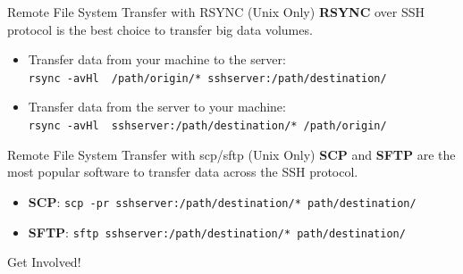 \documentclass[final,t]{beamer}
\begin{document}
\begin{frame}[fragile]{}
\begin{columns}[t]
\begin{column}{.32\linewidth}
      \begin{block}{Remote File System Transfer with RSYNC (Unix Only)}
       \textbf{RSYNC} over SSH protocol is the best choice to transfer big data volumes.
        \begin{itemize}
        \item Transfer data from your machine to the server:\\ \verb|rsync -avHl  /path/origin/* sshserver:/path/destination/|
        \item Transfer data from the server to your machine:\\ \verb|rsync -avHl  sshserver:/path/destination/* /path/origin/|
        \end{itemize}
      \end{block}

      \begin{block}{Remote File System Transfer with scp/sftp (Unix Only)}
       \textbf{SCP} and \textbf{SFTP} are the most popular software to transfer data across the SSH protocol.
        \begin{itemize}
        \item \textbf{SCP}: \verb|scp -pr sshserver:/path/destination/* path/destination/|
        \item \textbf{SFTP}: \verb|sftp sshserver:/path/destination/* path/destination/|
        \end{itemize}
      \end{block}

 
      \begin{block}{Get Involved!}
      \end{block}
 

    
 
    \end{column}
  \end{columns}
\end{frame}
\end{document}
